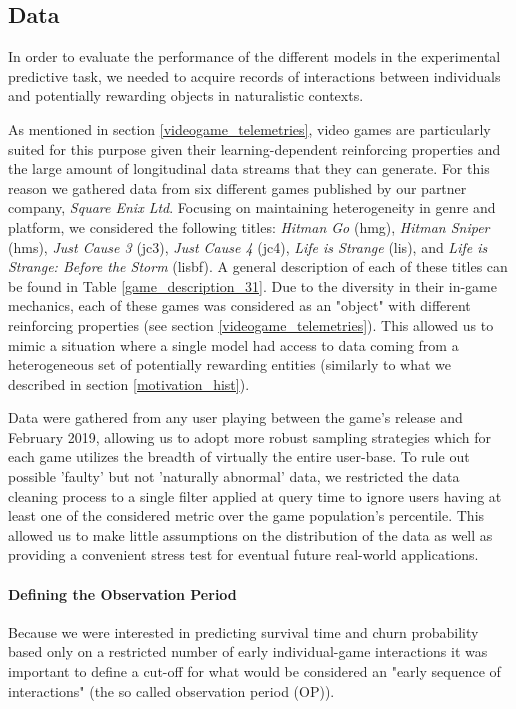 \subsection{Data}
\label{data_1}
In order to evaluate the performance of the different models in the experimental predictive task, we needed to acquire records of interactions between individuals and potentially rewarding objects in naturalistic contexts. 

As mentioned in section \ref{videogame_telemetries}, video games are particularly suited for this purpose given their learning-dependent reinforcing properties and the large amount of longitudinal data streams that they can generate. For this reason we gathered data from six different games published by our partner company, \textit{Square Enix Ltd}. Focusing on maintaining heterogeneity in genre and platform, we considered the following titles: \emph{Hitman Go} (hmg), \emph{Hitman Sniper} (hms), \emph{Just Cause 3} (jc3), \emph{Just Cause 4} (jc4), \emph{Life is Strange} (lis), and \emph{Life is Strange: Before the Storm} (lisbf). A general description of each of these titles can be found in Table \ref{game_description_31}. Due to the diversity in their in-game mechanics, each of these games was considered as an "object" with different reinforcing properties (see section \ref{videogame_telemetries}). This allowed us to mimic a situation where a single model had access to data coming from a heterogeneous set of potentially rewarding entities (similarly to what we described in section \ref{motivation_hist}). 

Data were gathered from any user playing between the game's release and February 2019, allowing us to adopt more robust sampling strategies which for each game utilizes the breadth of virtually the entire user-base. To rule out possible 'faulty' but not 'naturally abnormal' data, we restricted the data cleaning process to a single filter applied at query time to ignore users having at least one of the considered metric over the game population's  percentile. This allowed us to make little assumptions on the distribution of the data as well as providing a convenient stress test for eventual future real-world applications.



\paragraph*{Defining the Observation Period}
Because we were interested in predicting survival time and churn probability based only on a restricted number of early individual-game interactions it was important to define a cut-off for what would be considered an "early sequence of interactions" (the so called observation period (OP)). 


